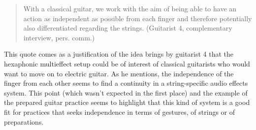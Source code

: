 \documentclass{article}
\begin{document}
\begin{quote}
With a classical guitar, we work with the aim of being able to have an action as independent as possible from each finger and therefore potentially also differentiated regarding the strings. (Guitarist 4, complementary interview, pers. comm.)
\end{quote}

This quote comes as a justification of the idea brings by guitarist 4 that the hexaphonic multieffect setup could be of interest of classical guitarists who would want to move on to electric guitar. As he mentions, the independence of the finger from each other seems to find a continuity in a string-specific audio effects system. This point (which wasn't expected in the first place) and the example of the prepared guitar practice seems to highlight that this kind of system is a good fit for practices that seeks independence in terms of gestures, of strings or of preparations.

%


\end{document}
